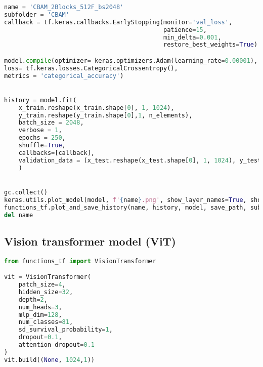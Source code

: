\begin{lstlisting}[language=Python]
name = 'CBAM_2Blocks_512F_bs2048'
subfolder = 'CBAM'
callback = tf.keras.callbacks.EarlyStopping(monitor='val_loss', 
                                            patience=15,
                                            min_delta=0.001,
                                            restore_best_weights=True)

model.compile(optimizer= keras.optimizers.Adam(learning_rate=0.00001),
loss= tf.keras.losses.CategoricalCrossentropy(),
metrics = 'categorical_accuracy')


history = model.fit(
    x_train.reshape(x_train.shape[0], 1, 1024),
    y_train.reshape(y_train.shape[0],1, n_elements),
    batch_size = 2048,
    verbose = 1,
    epochs = 250,
    shuffle=True,
    callbacks=[callback],
    validation_data = (x_test.reshape(x_test.shape[0], 1, 1024), y_test.reshape(y_test.shape[0],1, n_elements))
    )


gc.collect()
keras.utils.plot_model(model, f'{name}.png', show_layer_names=True, show_layer_activations=True, show_shapes=True)
functions_tf.plot_and_save_history(name, history, model, save_path, subfolder=subfolder)
del name
\end{lstlisting}

\hypertarget{vision-transformer-model-vit}{%
\subsection{Vision transformer model
(ViT)}\label{vision-transformer-model-vit}}

\begin{lstlisting}[language=Python]
from functions_tf import VisionTransformer

vit = VisionTransformer(
    patch_size=4,
    hidden_size=32,
    depth=2,
    num_heads=3,
    mlp_dim=128,
    num_classes=81,
    sd_survival_probability=1,
    dropout=0.1,
    attention_dropout=0.1
)
vit.build((None, 1024,1))
\end{lstlisting}

